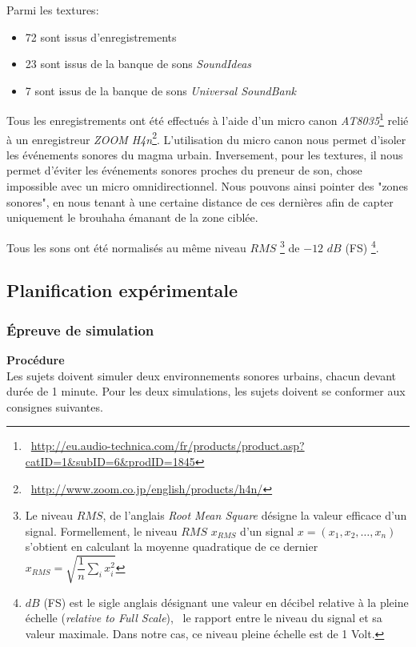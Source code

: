 Parmi les textures:

\begin{itemize}
\item 72 sont issus d’enregistrements
\item 23 sont issus de la banque de sons \emph{SoundIdeas}
\item 7 sont issus de la banque de sons \emph{Universal SoundBank}
\end{itemize}

Tous les enregistrements ont été effectués à l’aide d'un micro canon \emph{AT8035}\footnote{\Cf~\url{http://eu.audio-technica.com/fr/products/product.asp?catID=1&subID=6&prodID=1845}} relié à un enregistreur \emph{ZOOM H4n}\footnote{\Cf~\url{http://www.zoom.co.jp/english/products/h4n/}}. L’utilisation du micro canon nous permet d’isoler les événements sonores du magma urbain. Inversement, pour les textures, il nous permet d’éviter les événements sonores proches du preneur de son, chose impossible avec un micro omnidirectionnel. Nous pouvons ainsi pointer des "zones sonores", en nous tenant à une certaine distance de ces dernières afin de capter uniquement le brouhaha émanant de la zone ciblée.

Tous les sons ont été normalisés au même niveau $RMS$ \footnote{Le niveau $RMS$, de l'anglais \emph{Root Mean Square} désigne la valeur efficace d'un signal. Formellement, le niveau $RMS$ $x_{RMS}$ d'un signal $x=(x_1,x_2,\ldots,x_n)$ s'obtient en calculant la moyenne quadratique de ce dernier $x_{RMS}=\sqrt{\dfrac{1}{n}\sum\limits_{i} x_i^2}$} de $-12$ $dB$ (FS) \footnote{$dB$ (FS) est le sigle anglais désignant une valeur en décibel relative à la pleine échelle (\emph{relative to Full Scale}), \ie~le rapport entre le niveau du signal et sa valeur maximale. Dans notre cas, ce niveau pleine échelle est de 1 Volt.}.

\subsection{Planification expérimentale}

\subsubsection{Épreuve de simulation}
\label{sec:ch5_planExpSimu}

\textbf{Procédure} \\

Les sujets doivent simuler deux environnements sonores urbains, chacun devant durée de 1 minute.  Pour les deux simulations, les sujets doivent se conformer aux consignes suivantes.

